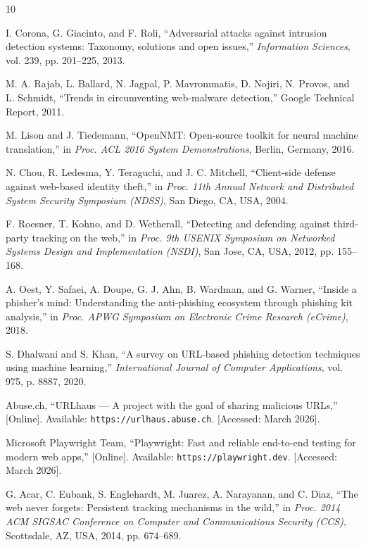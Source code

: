 \begin{thebibliography}{10}

I. Corona, G. Giacinto, and F. Roli,
``Adversarial attacks against intrusion detection systems: Taxonomy, solutions and open issues,''
\textit{Information Sciences}, vol. 239, pp. 201--225, 2013.

M. A. Rajab, L. Ballard, N. Jagpal, P. Mavrommatis, D. Nojiri, N. Provos, and L. Schmidt,
``Trends in circumventing web-malware detection,''
Google Technical Report, 2011.

M. Lison and J. Tiedemann,
``OpenNMT: Open-source toolkit for neural machine translation,''
in \textit{Proc. ACL 2016 System Demonstrations}, Berlin, Germany, 2016.

N. Chou, R. Ledesma, Y. Teraguchi, and J. C. Mitchell,
``Client-side defense against web-based identity theft,''
in \textit{Proc. 11th Annual Network and Distributed System Security Symposium (NDSS)}, San Diego, CA, USA, 2004.

F. Roesner, T. Kohno, and D. Wetherall,
``Detecting and defending against third-party tracking on the web,''
in \textit{Proc. 9th USENIX Symposium on Networked Systems Design and Implementation (NSDI)}, San Jose, CA, USA, 2012, pp. 155--168.

A. Oest, Y. Safaei, A. Doupe, G. J. Ahn, B. Wardman, and G. Warner,
``Inside a phisher's mind: Understanding the anti-phishing ecosystem through phishing kit analysis,''
in \textit{Proc. APWG Symposium on Electronic Crime Research (eCrime)}, 2018.

S. Dhalwani and S. Khan,
``A survey on URL-based phishing detection techniques using machine learning,''
\textit{International Journal of Computer Applications}, vol. 975, p. 8887, 2020.

Abuse.ch,
``URLhaus --- A project with the goal of sharing malicious URLs,''
[Online]. Available: \texttt{https://urlhaus.abuse.ch}.  
[Accessed: March 2026].

Microsoft Playwright Team,
``Playwright: Fast and reliable end-to-end testing for modern web apps,''
[Online]. Available: \texttt{https://playwright.dev}.  
[Accessed: March 2026].

G. Acar, C. Eubank, S. Englehardt, M. Juarez, A. Narayanan, and C. Diaz,
``The web never forgets: Persistent tracking mechanisms in the wild,''
in \textit{Proc. 2014 ACM SIGSAC Conference on Computer and Communications Security (CCS)}, Scottsdale, AZ, USA, 2014, pp. 674--689.

\end{thebibliography}